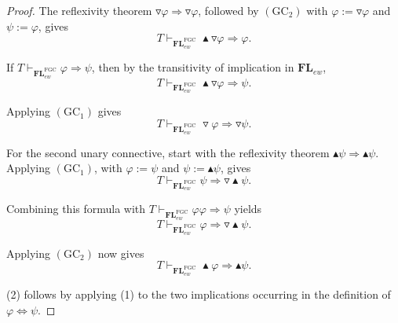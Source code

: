 \documentclass[10pt,a4paper]{amsart}
\begin{document}
\begin{proof}
The reflexivity theorem
$\triangledown\varphi\Rightarrow\triangledown\varphi$, followed by
$(\mathrm{GC}_2)$ with $\varphi:=\triangledown\varphi$ and
$\psi:=\varphi$, gives
\[
 T\vdash_{\mathbf{FL}^{\mathrm{FGC}}_{ew}}
 \blacktriangle\triangledown\varphi\Rightarrow\varphi.
\]

If $T\vdash_{\mathbf{FL}^{\mathrm{FGC}}_{ew}}\varphi\Rightarrow\psi$, then by the transitivity of implication in $\mathbf{FL}_{ew}$,
\[
 T\vdash_{\mathbf{FL}^{\mathrm{FGC}}_{ew}}
 \blacktriangle\triangledown\varphi\Rightarrow\psi.
\]

Applying $(\mathrm{GC}_1)$ gives
\[
 T\vdash_{\mathbf{FL}^{\mathrm{FGC}}_{ew}}
 \triangledown\varphi\Rightarrow\triangledown\psi.
\]

For the second unary connective, start with the reflexivity theorem
$\blacktriangle\psi\Rightarrow\blacktriangle\psi$.  Applying $(\mathrm{GC}_1)$, with
$\varphi:=\psi$ and $\psi:=\blacktriangle\psi$, gives
\[
 T\vdash_{\mathbf{FL}^{\mathrm{FGC}}_{ew}}
 \psi\Rightarrow\triangledown\blacktriangle\psi.
\]

Combining this formula with $T\vdash_{\mathbf{FL}^{\mathrm{FGC}}_{ew}}\varphi\varphi\Rightarrow\psi$ yields
\[
 T\vdash_{\mathbf{FL}^{\mathrm{FGC}}_{ew}}
 \varphi\Rightarrow\triangledown\blacktriangle\psi.
\]

Applying $(\mathrm{GC}_2)$ now gives
\[
 T\vdash_{\mathbf{FL}^{\mathrm{FGC}}_{ew}}
 \blacktriangle\varphi\Rightarrow\blacktriangle\psi.
\]

(2) follows by applying (1) to the two
implications occurring in the definition of
$\varphi\Leftrightarrow\psi$.
\end{proof}
\end{document}
